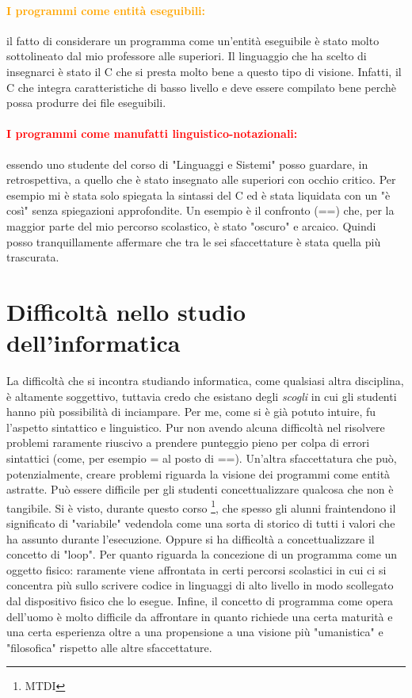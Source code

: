 \paragraph{\textcolor{orange}{I programmi come entità eseguibili:}}
il fatto di considerare un programma come un'entità eseguibile è
stato molto sottolineato dal mio professore alle superiori. Il linguaggio
che ha scelto di insegnarci è stato il C che si presta molto bene a
questo tipo di visione. Infatti, il C che integra caratteristiche di
basso livello e deve essere compilato bene perchè possa produrre dei file
eseguibili. 

\paragraph{\textcolor{red}{I programmi come manufatti linguistico-notazionali:}}
essendo uno studente del corso di "Linguaggi e Sistemi" posso guardare, in
retrospettiva, a quello che è stato insegnato alle superiori con occhio critico.
Per esempio mi è stata solo spiegata la sintassi del C ed è stata liquidata
con un "è così" senza spiegazioni approfondite. Un esempio è il confronto
(==) che, per la maggior parte del mio percorso scolastico, è stato "oscuro"
e arcaico. Quindi posso tranquillamente affermare che tra le sei sfaccettature
è stata quella più trascurata.


\section{Difficoltà nello studio dell'informatica}

La difficoltà che si incontra studiando informatica, come qualsiasi altra
disciplina, è altamente soggettivo, tuttavia credo che esistano degli \textit{scogli}
in cui gli studenti hanno più possibilità di inciampare. Per me, come si è già potuto
intuire, fu l'aspetto sintattico e linguistico. Pur non avendo alcuna difficoltà
nel risolvere problemi raramente riuscivo a prendere punteggio pieno per 
colpa di errori sintattici (come, per esempio = al posto di ==). 
Un'altra sfaccettatura che può, potenzialmente, creare problemi riguarda la 
visione dei programmi come entità astratte. Può essere difficile per gli
studenti concettualizzare qualcosa che non è tangibile. Si è visto, durante
questo corso \footnote{MTDI}, che spesso gli alunni fraintendono il significato
di "variabile" vedendola come una sorta di storico di tutti i valori che ha assunto
durante l'esecuzione. Oppure si ha difficoltà a concettualizzare il concetto
di "loop".
Per quanto riguarda la concezione di un programma come un oggetto fisico: raramente
viene affrontata in certi percorsi scolastici in cui ci si concentra più sullo
scrivere codice in linguaggi di alto livello in modo scollegato dal dispositivo 
fisico che lo esegue. Infine, il concetto di programma come opera dell'uomo
è molto difficile da affrontare in quanto richiede una certa maturità e una
certa esperienza oltre a una propensione a una visione più "umanistica" e "filosofica"
rispetto alle altre sfaccettature.

